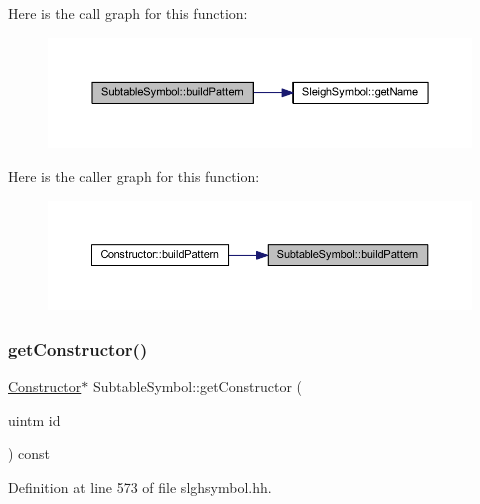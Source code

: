 Here is the call graph for this function\+:
\nopagebreak
\begin{figure}[H]
\begin{center}
\leavevmode
\includegraphics[width=350pt]{class_subtable_symbol_a065893cefe01e3f9ae6310535c593bde_cgraph}
\end{center}
\end{figure}
Here is the caller graph for this function\+:
\nopagebreak
\begin{figure}[H]
\begin{center}
\leavevmode
\includegraphics[width=350pt]{class_subtable_symbol_a065893cefe01e3f9ae6310535c593bde_icgraph}
\end{center}
\end{figure}
\mbox{\label{class_subtable_symbol_aace2d4dcb93073aa935086357bee4033}} 
\subsubsection{\texorpdfstring{getConstructor()}{getConstructor()}}
{\footnotesize\ttfamily \mbox{\hyperlink{class_constructor}{Constructor}}$\ast$ Subtable\+Symbol\+::get\+Constructor (\begin{DoxyParamCaption}\item[{uintm}]{id }\end{DoxyParamCaption}) const\hspace{0.3cm}{\ttfamily [inline]}}



Definition at line 573 of file slghsymbol.\+hh.


